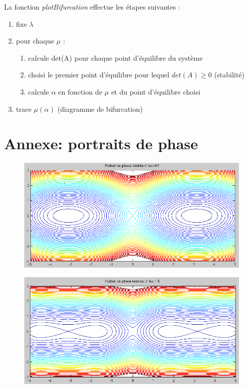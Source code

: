 \documentclass[11pt]{article}
\begin{document}
La fonction \emph{plotBifurcation} effectue les étapes suivantes :
\begin{enumerate}
	\item fixe $\lambda$
	\item pour chaque $\mu$ :
	\begin{enumerate}
		\item calcule det(A) pour chaque point d'équilibre du système
		\item choisi le premier point d'équilibre pour lequel $det(A) \geq 0$ (stabilité)
		\item calcule $\alpha$ en fonction de $\mu$ et du point d'équilibre choisi
	\end{enumerate}
	\item trace $\mu(\alpha)$ (diagramme de bifurcation)

\end{enumerate}
\newpage

\appendix
\section{Annexe: portraits de phase}
\begin{figure}[h!]
	\centering
	\includegraphics[scale=0.64]{Figures/rapport_pp05.png}
\end{figure}

\begin{figure}[h!]
	\centering
	\includegraphics[scale=0.65]{Figures/rapport_pp15.png}
\end{figure}
\end{document}
